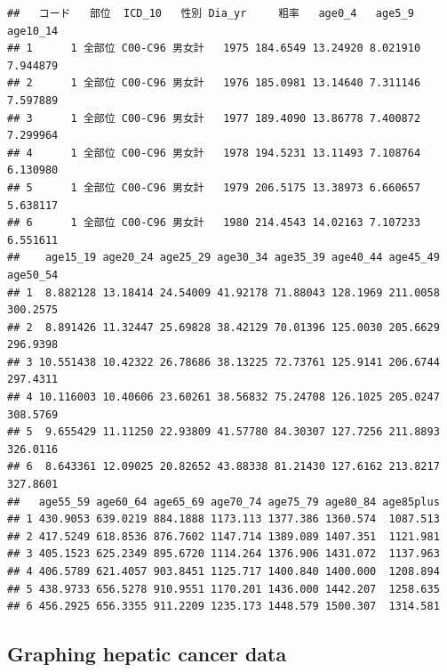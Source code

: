 \documentclass[11pt,]{article}
\begin{document}
\begin{verbatim}
##   コード   部位  ICD_10   性別 Dia_yr     粗率   age0_4   age5_9 age10_14
## 1      1 全部位 C00-C96 男女計   1975 184.6549 13.24920 8.021910 7.944879
## 2      1 全部位 C00-C96 男女計   1976 185.0981 13.14640 7.311146 7.597889
## 3      1 全部位 C00-C96 男女計   1977 189.4090 13.86778 7.400872 7.299964
## 4      1 全部位 C00-C96 男女計   1978 194.5231 13.11493 7.108764 6.130980
## 5      1 全部位 C00-C96 男女計   1979 206.5175 13.38973 6.660657 5.638117
## 6      1 全部位 C00-C96 男女計   1980 214.4543 14.02163 7.107233 6.551611
##    age15_19 age20_24 age25_29 age30_34 age35_39 age40_44 age45_49 age50_54
## 1  8.882128 13.18414 24.54009 41.92178 71.88043 128.1969 211.0058 300.2575
## 2  8.891426 11.32447 25.69828 38.42129 70.01396 125.0030 205.6629 296.9398
## 3 10.551438 10.42322 26.78686 38.13225 72.73761 125.9141 206.6744 297.4311
## 4 10.116003 10.40606 23.60261 38.56832 75.24708 126.1025 205.0247 308.5769
## 5  9.655429 11.11250 22.93809 41.57780 84.30307 127.7256 211.8893 326.0116
## 6  8.643361 12.09025 20.82652 43.88338 81.21430 127.6162 213.8217 327.8601
##   age55_59 age60_64 age65_69 age70_74 age75_79 age80_84 age85plus
## 1 430.9053 639.0219 884.1888 1173.113 1377.386 1360.574  1087.513
## 2 417.5249 618.8536 876.7602 1147.714 1389.089 1407.351  1121.981
## 3 405.1523 625.2349 895.6720 1114.264 1376.906 1431.072  1137.963
## 4 406.5789 621.4057 903.8451 1125.717 1400.840 1400.000  1208.894
## 5 438.9733 656.5278 910.9551 1170.201 1436.000 1442.207  1258.635
## 6 456.2925 656.3355 911.2209 1235.173 1448.579 1500.307  1314.581
\end{verbatim}

\subsection{Graphing hepatic cancer
data}\label{graphing-hepatic-cancer-data}
\end{document}
